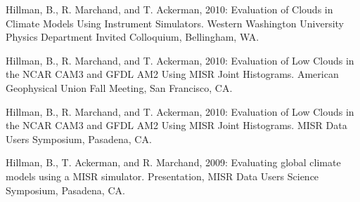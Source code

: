 \documentclass[10pt]{article}
\newenvironment{itemize*}{
   \begin{list}{}
      { 
         \setlength{\itemsep}{5pt}
         \setlength{\parsep}{0pt}
         \setlength{\topsep}{0pt}
         \setlength{\leftmargin}{0em} 
      } 
} {
   \end{list}
}
\begin{document}
\begin{itemize*}
    \item Hillman, B., R. Marchand, and T. Ackerman,
    2010:
    Evaluation of Clouds in Climate Models Using Instrument Simulators.
    Western Washington University Physics Department Invited Colloquium,
    Bellingham, WA.

    \item Hillman, B., R. Marchand, and T. Ackerman, 
    2010:
    Evaluation of Low Clouds in the NCAR CAM3 and GFDL AM2 Using MISR Joint 
    Histograms.
    American Geophysical Union Fall Meeting, 
    San Francisco, CA.

    \item Hillman, B., R. Marchand, and T. Ackerman,
    2010:
    Evaluation of Low Clouds in the NCAR CAM3 and GFDL AM2 Using MISR Joint 
    Histograms.
    MISR Data Users Symposium, 
    Pasadena, CA.

    \item Hillman, B., T. Ackerman, and R. Marchand,
    2009:
    Evaluating global climate models using a MISR simulator.
    Presentation, 
    MISR Data Users Science Symposium, 
    Pasadena, CA.

\end{itemize*}
\end{document}
